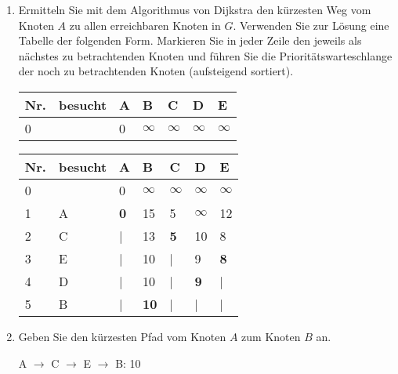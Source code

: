 \documentclass{lehramt-informatik-aufgabe}
\begin{document}
\begin{enumerate}


\item Ermitteln Sie mit dem Algorithmus von Dijkstra den kürzesten Weg
vom Knoten $A$ zu allen erreichbaren Knoten in $G$. Verwenden Sie zur
Lösung eine Tabelle der folgenden Form. Markieren Sie in jeder Zeile den
jeweils als nächstes zu betrachtenden Knoten und führen Sie die
Prioritätswarteschlange der noch zu betrachtenden Knoten (aufsteigend
sortiert).

\begin{tabular}{lllllll}
\bf{Nr.}     & \bf{besucht} & \bf{A}       & \bf{B}       & \bf{C}       & \bf{D}       & \bf{E}       \\
\hline
0            &              & 0            & $\infty$     & $\infty$     & $\infty$     & $\infty$     \\
\end{tabular}

\begin{liAntwort}
\begin{tabular}{lllllll}
\bf{Nr.}     & \bf{besucht} & \bf{A}       & \bf{B}       & \bf{C}       & \bf{D}       & \bf{E}       \\
\hline
0            &              & 0            & $\infty$     & $\infty$     & $\infty$     & $\infty$     \\
1            & A            & \bf{0}       & 15           & 5            & $\infty$     & 12           \\
2            & C            & |            & 13           & \bf{5}       & 10           & 8            \\
3            & E            & |            & 10           & |            & 9            & \bf{8}       \\
4            & D            & |            & 10           & |            & \bf{9}       & |            \\
5            & B            & |            & \bf{10}      & |            & |            & |            \\
\end{tabular}
\end{liAntwort}


\item Geben Sie den kürzesten Pfad vom Knoten $A$ zum Knoten $B$ an.

\begin{liAntwort}
A $\rightarrow$ C $\rightarrow$ E $\rightarrow$ B: 10


\end{liAntwort}
\end{enumerate}
\end{document}

